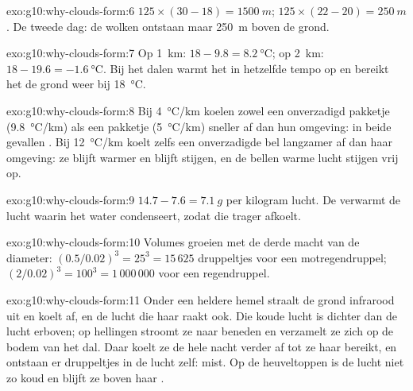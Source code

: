 \begin{solution}{exo:g10:why-clouds-form:6}
$125 \times (30 - 18) = \qty{1500}{m}$; $125 \times (22 - 20) =
\qty{250}{m}$. De tweede dag: de wolken ontstaan maar \qty{250}{m} boven de
grond.
\end{solution}

\begin{solution}{exo:g10:why-clouds-form:7}
Op \qty{1}{km}: $18 - 9.8 = \qty{8.2}{\degreeCelsius}$; op \qty{2}{km}:
$18 - 19.6 = \qty{-1.6}{\degreeCelsius}$. Bij het dalen warmt het in hetzelfde
tempo op en bereikt het de grond weer bij \qty{18}{\degreeCelsius}.
\end{solution}

\begin{solution}{exo:g10:why-clouds-form:8}
Bij \qty{4}{\degreeCelsius/km} koelen zowel een onverzadigd pakketje
(\qty{9.8}{\degreeCelsius/km}) als een  pakketje
(\qty{5}{\degreeCelsius/km}) sneller af dan hun omgeving: in beide gevallen
. Bij \qty{12}{\degreeCelsius/km} koelt zelfs een onverzadigde bel
langzamer af dan haar omgeving: ze blijft warmer en blijft stijgen, en de bellen
warme lucht stijgen vrij op.
\end{solution}

\begin{solution}{exo:g10:why-clouds-form:9}
$14.7 - 7.6 = \qty{7.1}{g}$ per kilogram lucht. De  verwarmt de
lucht waarin het water condenseert, zodat die trager afkoelt.
\end{solution}

\begin{solution}{exo:g10:why-clouds-form:10}
Volumes groeien met de derde macht van de diameter: $(0.5/0.02)^3 = 25^3 = 15\,625$
druppeltjes voor een motregendruppel; $(2/0.02)^3 = 100^3 = 1\,000\,000$ voor een
regendruppel.
\end{solution}

\begin{solution}{exo:g10:why-clouds-form:11}
Onder een heldere hemel straalt de grond infrarood uit en koelt af, en de lucht
die haar raakt ook. Die koude lucht is dichter dan de lucht erboven; op hellingen
stroomt ze naar beneden en verzamelt ze zich op de bodem van het dal. Daar koelt
ze de hele nacht verder af tot ze haar  bereikt, en ontstaan er
druppeltjes in de lucht zelf: mist. Op de heuveltoppen is de lucht niet zo koud
en blijft ze boven haar .
\end{solution}

